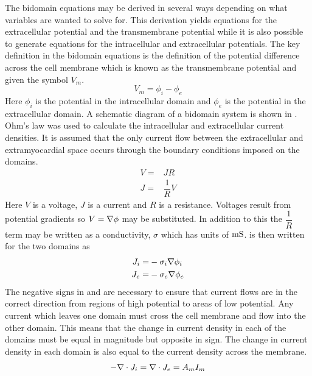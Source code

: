 The bidomain equations may be derived in several ways depending on what
variables are wanted to solve for. This derivation yields equations for the
extracellular potential and the transmembrane potential while it is also
possible to generate equations for the intracellular and extracellular
potentials. The key definition in the bidomain equations is the definition of the
potential difference across the cell membrane which is known as the
transmembrane potential and given the symbol $V_m$.
\begin{equation}
  V_m = \phi_i - \phi_e
  \label{eqn:Vm_init_definition}
\end{equation}
Here $\phi_i$ is the potential in the intracellular domain and $\phi_e$ is the
potential in the extracellular domain. A schematic diagram of a bidomain
system is shown in . Ohm's law was  used
to calculate the intracellular and extracellular current densities. It is
assumed that the only current flow between the 
extracellular and extramyocardial space occurs through the boundary conditions
imposed on the domains.
\begin{align}
  V=&JR \nonumber \\
  J=&\dfrac{1}{R} V 
  \label{eqn:Ohms_Law}
\end{align}
Here $V$ is a voltage, $J$ is a current and $R$ is a resistance. Voltages
result from potential gradients so $V= \nabla {\phi}$ may be substituted. In
addition to this the $\dfrac{1}{R}$ term may be written as a conductivity,
$\sigma$ which has units of $\mathrm{mS}$.  is then written for
the two domains as 
\begin{align}
  J_i=& - \sigma_i  \nabla {\phi_i} 
  \label{eqn:J_i_from_Ohms_Law} \\
  J_e=& - \sigma_e  \nabla {\phi_e}
  \label{eqn:J_e_from_Ohms_Law}
\end{align}
The negative signs in  and
 are necessary to ensure that current flows are
in the correct direction from regions of high potential to areas of low
potential. Any current which leaves one domain must cross the cell membrane and flow
into the other domain. This means that the change in current density in each
of the domains must be equal in magnitude but opposite in sign. The change in
current density in each domain is also equal to the current density across the
membrane.
\begin{equation}
  -   \nabla   \cdot  J_i  =   \nabla   \cdot  J_e  = A_mI_m
  \label{eqn:equal_current_densities}
\end{equation}
